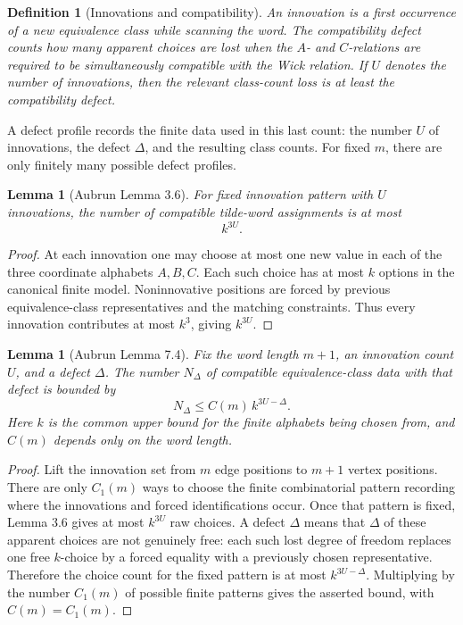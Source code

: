 \documentclass[11pt,oneside]{book}
\newtheorem{lemma}[theorem]{Lemma}
\newtheorem{definition}[theorem]{Definition}
\newcommand{\1}{\mathbf 1}
\begin{document}
\begin{definition}[Innovations and compatibility]
An innovation is a first occurrence of a new equivalence class while scanning
the word.  The compatibility defect counts how many apparent choices are lost
when the \(A\)- and \(C\)-relations are required to be simultaneously
compatible with the Wick relation.  If \(U\) denotes the number of innovations,
then the relevant class-count loss is at least the compatibility defect.
\end{definition}

A defect profile records the finite data used in this last count: the number
\(U\) of innovations, the defect \(\Delta\), and the resulting class counts.
For fixed \(m\), there are only finitely many possible defect profiles.

\begin{lemma}[Aubrun Lemma 3.6]
For fixed innovation pattern with \(U\) innovations, the number of compatible
tilde-word assignments is at most
\[
  k^{3U}.
\]
\end{lemma}

\begin{proof}
At each innovation one may choose at most one new value in each of the three
coordinate alphabets \(A,B,C\).  Each such choice has at most \(k\) options in
the canonical finite model.  Noninnovative positions are forced by previous
equivalence-class representatives and the matching constraints.  Thus every
innovation contributes at most \(k^3\), giving \(k^{3U}\).
\end{proof}

\begin{lemma}[Aubrun Lemma 7.4]
Fix the word length \(m+1\), an innovation count \(U\), and a defect
\(\Delta\).  The number \(N_\Delta\) of compatible equivalence-class data with
that defect is bounded by
\[
  N_{\Delta}\le C(m)\,k^{3U-\Delta}.
\]
Here \(k\) is the common upper bound for the finite alphabets being chosen
from, and \(C(m)\) depends only on the word length.
\end{lemma}

\begin{proof}
Lift the innovation set from \(m\) edge positions to \(m+1\) vertex positions.
There are only \(C_1(m)\) ways to choose the finite combinatorial pattern
recording where the innovations and forced identifications occur.  Once that
pattern is fixed, Lemma 3.6 gives at most \(k^{3U}\) raw choices.  A defect
\(\Delta\) means that \(\Delta\) of these apparent choices are not genuinely
free: each such lost degree of freedom replaces one free \(k\)-choice by a
forced equality with a previously chosen representative.  Therefore the
choice count for the fixed pattern is at most \(k^{3U-\Delta}\).  Multiplying
by the number \(C_1(m)\) of possible finite patterns gives the asserted
bound, with \(C(m)=C_1(m)\).
\end{proof}
\end{document}
